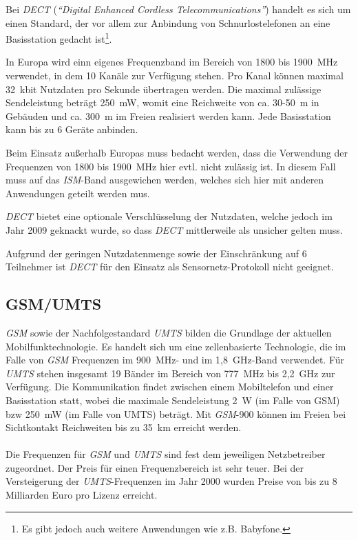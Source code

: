         Bei \emph{DECT} (\emph{"`Digital Enhanced Cordless Telecommunications"'}) handelt es sich um einen Standard, 
        der vor allem zur Anbindung von Schnurlostelefonen an eine Basisstation gedacht ist\footnote{Es gibt
        jedoch auch weitere Anwendungen wie z.B. Babyfone.}. 

        In Europa wird einn eigenes Frequenzband im Bereich von 1800 bis 1900~MHz verwendet, in dem 10 
        Kanäle zur Verfügung stehen. Pro Kanal können maximal 32~kbit Nutzdaten pro Sekunde übertragen
        werden. Die maximal zulässige Sendeleistung beträgt 250~mW, womit eine Reichweite von ca. 30-50~m 
        in Gebäuden und ca. 300~m im Freien realisiert werden kann. Jede Basisstation kann
        bis zu 6 Geräte anbinden.

        Beim Einsatz außerhalb Europas muss bedacht werden, dass die Verwendung der Frequenzen von
        1800 bis 1900~MHz hier evtl. nicht zulässig ist. In diesem Fall muss auf das \emph{ISM}-Band 
        ausgewichen werden, welches sich hier mit anderen Anwendungen geteilt werden mus.

        \emph{DECT} bietet eine optionale Verschlüsselung der Nutzdaten, welche jedoch im Jahr 2009 geknackt 
        wurde, so dass \emph{DECT} mittlerweile als unsicher gelten muss.

        Aufgrund der geringen Nutzdatenmenge sowie der Einschränkung auf 6 Teilnehmer ist
        \emph{DECT} für den Einsatz als Sensornetz-Protokoll nicht geeignet.

    \subsection{GSM/UMTS}
        \emph{GSM} sowie der Nachfolgestandard \emph{UMTS} bilden die Grundlage der aktuellen Mobilfunktechnologie.
        Es handelt sich um eine zellenbasierte Technologie, die im Falle von \emph{GSM} Frequenzen im
        900~MHz- und im 1,8~GHz-Band verwendet. Für \emph{UMTS} stehen insgesamt 19 Bänder im Bereich von 777~MHz 
        bis 2,2~GHz zur Verfügung. Die Kommunikation findet zwischen einem Mobiltelefon und einer
        Basisstation statt, wobei die maximale Sendeleistung 2~W (im Falle von GSM) bzw 250~mW (im Falle
        von UMTS) beträgt. Mit \emph{GSM}-900 können im Freien bei Sichtkontakt Reichweiten bis zu 35~km erreicht
        werden.\\
        \\
        Die Frequenzen für \emph{GSM} und \emph{UMTS} sind fest dem jeweiligen Netzbetreiber zugeordnet. Der Preis
        für einen Frequenzbereich ist sehr teuer. Bei der Versteigerung der \emph{UMTS}-Frequenzen im 
        Jahr 2000 wurden Preise von bis zu 8 Milliarden Euro pro Lizenz erreicht. 


